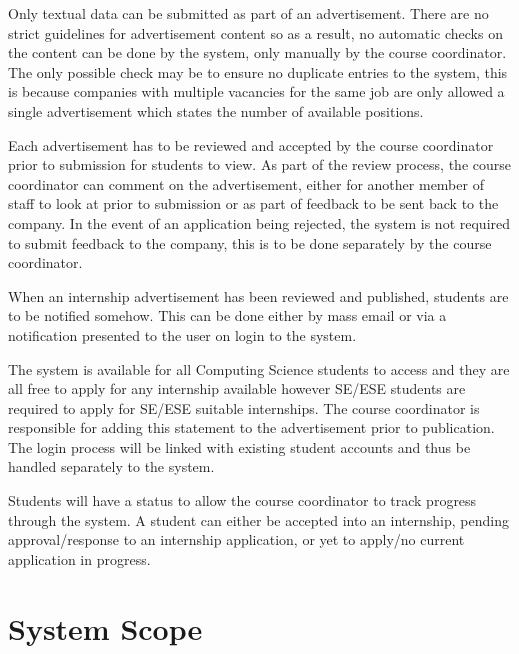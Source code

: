 \documentclass{l3deliverable}
\begin{document}
Only textual data can be submitted as part of an advertisement. There are no
strict guidelines for advertisement content so as a result, no automatic checks
on the content can be done by the system, only manually by the course
coordinator. The only possible check may be to ensure no duplicate entries
to the system, this is because companies with multiple vacancies for the same
job are only allowed a single advertisement which states the number of
available positions.

Each advertisement has to be reviewed and accepted by the course coordinator
prior to submission for students to view. As part of the review process, the
course coordinator can comment on the advertisement, either for another member
of staff to look at prior to submission or as part of feedback to be sent back
to the company. In the event of an application being rejected, the system is
not required to submit feedback to the company, this is to be done separately
by the course coordinator.

When an internship advertisement has been reviewed and published, students 
are to be notified somehow. This can be done either by mass email or via a 
notification presented to the user on login to the system.

The system is available for all Computing Science students to access and 
they are all free to apply for any internship available however SE/ESE students
are required to apply for SE/ESE suitable internships. The course coordinator is
responsible for adding this statement to the advertisement prior to publication.
The login process will be linked with existing student accounts and thus be
handled separately to the system.

Students will have a status to allow the course coordinator to track progress
through the system. A student can either be accepted into an internship, pending
approval/response to an internship application, or yet to apply/no current 
application in progress.


\section{System Scope}

\end{document}
